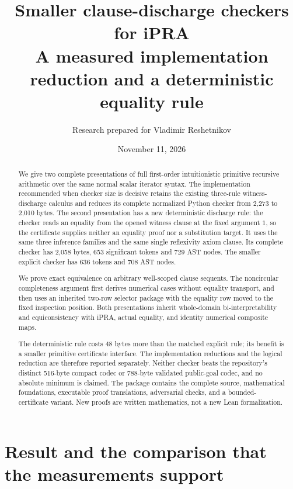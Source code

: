 \documentclass[11pt,letterpaper]{article}
\title{\color{ink}Smaller clause-discharge checkers for iPRA\\[6pt]
\large A measured implementation reduction and a deterministic equality rule}
\author{Research prepared for Vladimir Reshetnikov}
\date{November 11, 2026}
\theoremstyle{definition}\newtheorem{definition}[theorem]{Definition}
\theoremstyle{remark}\newtheorem{remark}[theorem]{Remark}
\begin{document}
\maketitle
\begin{abstract}
We give two complete presentations of full first-order intuitionistic
primitive recursive arithmetic over the same normal scalar iterator syntax.
The implementation recommended when checker size is decisive retains the
existing three-rule witness-discharge calculus and reduces its complete
normalized Python checker from 2,273 to 2,010 bytes. The second presentation
has a new deterministic discharge rule: the checker reads an equality from
the opened witness clause at the fixed argument $1$, so the certificate
supplies neither an equality proof nor a substitution target. It uses the
same three inference families and the same single reflexivity axiom clause.
Its complete checker has 2,058 bytes, 653 significant tokens and 729 AST
nodes. The smaller explicit checker has 636 tokens and 708 AST nodes.

We prove exact equivalence on arbitrary well-scoped clause sequents. The
noncircular completeness argument first derives numerical cases without
equality transport, and then uses an inherited two-row selector package
with the equality row moved to the fixed inspection position. Both
presentations inherit whole-domain bi-interpretability and equiconsistency
with iPRA, actual equality, and identity numerical composite maps.

The deterministic rule costs 48 bytes more than the matched explicit rule;
its benefit is a smaller primitive certificate interface. The implementation
reductions and the logical reduction are therefore reported separately.
Neither checker beats the repository's distinct 516-byte compact codec or
788-byte validated public-goal codec, and no absolute minimum is claimed.
The package contains the complete source, mathematical foundations,
executable proof translations, adversarial checks, and a bounded-certificate
variant. New proofs are written mathematics, not a new Lean formalization.
\end{abstract}
\clearpage
\begingroup\fontsize{9}{10}\selectfont\setlength{\parskip}{0pt}\setcounter{tocdepth}{1}
\tableofcontents\endgroup
\clearpage

\section{Result and the comparison that the measurements support}
\label{sec:result}
\end{document}
